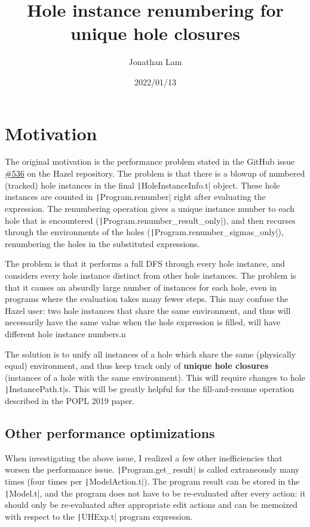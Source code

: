 \documentclass{article}
\title{Hole instance renumbering for unique hole closures}
\author{Jonathan Lam}
\date{2022/01/13}
\begin{document}
\maketitle{}

\section{Motivation}
The original motivation is the performance problem stated in the GitHub issue \href{https://github.com/hazelgrove/hazel/issues/536}{\#536} on the Hazel repository. The problem is that there is a blowup of numbered (tracked) hole instances in the final \texttt|HoleInstanceInfo.t| object. These hole instances are counted in \texttt|Program.renumber| right after evaluating the expression. The renumbering operation gives a unique instance number to each hole that is encountered (\texttt|Program.renumber_result_only|), and then recurses through the environments of the holes (\texttt|Program.renumber_sigmas_only|), renumbering the holes in the substituted expressions.

The problem is that it performs a full DFS through every hole instance, and considers every hole instance distinct from other hole instances. The problem is that it causes an absurdly large number of instances for each hole, even in programs where the evaluation takes many fewer steps. This may confuse the Hazel user: two hole instances that share the same environment, and thus will necessarily have the same value when the hole expression is filled, will have different hole instance numbers.n

The solution is to unify all instances of a hole which share the same (physically equal) environment, and thus keep track only of \textbf{unique hole closures} (instances of a hole with the same environment). This will require changes to hole \texttt|InstancePath.t|s. This will be greatly helpful for the fill-and-resume operation described in the POPL 2019 paper.

\subsection{Other performance optimizations}
When investigating the above issue, I realized a few other inefficiencies that worsen the performance issue. \texttt|Program.get_result| is called extraneously many times (four times per \texttt|ModelAction.t|). The program result can be stored in the \texttt|Model.t|, and the program does not have to be re-evaluated after every action: it should only be re-evaluated after appropriate edit actions and can be memoized with respect to the \texttt|UHExp.t| program expression.
\end{document}
